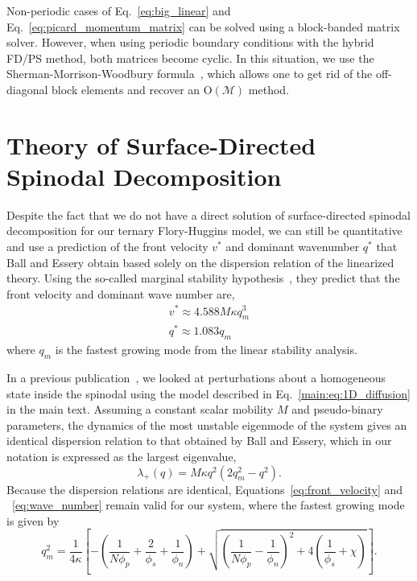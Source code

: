 \documentclass[journal=mamobx,manuscript=suppinfo]{achemso}
\begin{document}
Non-periodic cases of Eq.~\ref{eq:big_linear} and Eq.~\ref{eq:picard_momentum_matrix} can be solved using a block-banded matrix solver.
However, when using periodic boundary conditions with the hybrid FD/PS method, both matrices become cyclic.
In this situation, we use the Sherman-Morrison-Woodbury formula~\cite{Press2002}, which allows one to get rid of the off-diagonal block elements and recover an O$(\mathcal{M})$ method.


\section{Theory of Surface-Directed Spinodal Decomposition}
Despite the fact that we do not have a direct solution of surface-directed spinodal decomposition for our ternary Flory-Huggins model, we can still be quantitative and use a prediction of the front velocity $v^{*}$ and dominant wavenumber $q^{*}$ that Ball and Essery obtain based solely on the dispersion relation of the linearized theory.
Using the so-called marginal stability hypothesis~\cite{Ball1990, vanSaarloos1987, vanSaarloos1988}, they predict that the front velocity and dominant wave number are,
\begin{gather}
v^{*} \approx 4.588 M \kappa q_{m}^{3} \label{eq:front_velocity} \\
q^{*} \approx 1.083 q_{m} \label{eq:wave_number}
\end{gather}
where $q_{m}$ is the fastest growing mode from the linear stability analysis.

In a previous publication~\cite{Tree2017}, we looked at perturbations about a homogeneous state inside the spinodal using the model described in Eq.~\ref{main:eq:1D_diffusion} in the main text.
Assuming a constant scalar mobility $M$ and pseudo-binary parameters, the dynamics of the most unstable eigenmode of the system gives an identical dispersion relation to that obtained by Ball and Essery, which in our notation is expressed as the largest eigenvalue,
\begin{equation}
\lambda_{+}(q) = M \kappa q^{2} (2 q_{m}^{2} - q^{2} ) \textrm{.}
\end{equation}
Because the dispersion relations are identical, Equations~\ref{eq:front_velocity} and ~\ref{eq:wave_number} remain valid for our system, where the fastest growing mode is given by
\begin{equation}
q_{m}^{2} = 
  \frac{1}{4 \kappa} \left [ -\left ( \frac{1}{N \phi_{p}} + \frac{2}{\phi_{s}} + \frac{1}{\phi_{n}} \right )
  + \sqrt{ \left ( \frac{1}{N \phi_{p}} - \frac{1}{\phi_{n}} \right )^{2} 
    + 4 \left ( \frac{1}{\phi_{s}} + \chi \right ) 
  } \right ] \textrm{.}
\end{equation}
\end{document}
